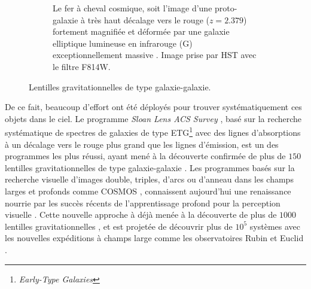 \begin{figure}[tb!]
\begin{subfigure}[t]{0.45\textwidth}
                \caption{Le fer à cheval cosmique, soit l'image d'une proto-galaxie à très haut décalage vers le rouge 
                        ($z=2.379$) fortement magnifiée et déformée par une galaxie elliptique lumineuse en infrarouge (G) exceptionnellement massive 
                        \citep[${5.2\times 10^{12}\, h_{72}^{-1}\, M_\odot}$,][]{Schuldt2019}. 
                 Image prise par HST avec le filtre F814W.}
                \label{fig:sdssj1148}
        \end{subfigure}
        \caption{Lentilles gravitationnelles de type galaxie-galaxie.}
        \label{fig:important lenses}
\end{figure}
 

De ce fait, beaucoup d'effort ont été déployés pour trouver systématiquement ces objets dans le ciel. Le programme 
\textit{Sloan Lens ACS Survey} \citep[SLAC,][]{Bolton2005,Bolton2006}, basé sur la recherche systématique de spectres de galaxies de type ETG\footnote{\textit{Early-Type Galaxies}} 
avec des lignes d'absorptions à un décalage vers le rouge plus grand que les lignes d'émission, 
est un des programmes les plus réussi, ayant mené à la découverte 
confirmée de plus de $150$ lentilles gravitationnelles de type galaxie-galaxie \citep{Bolton2008,Shu2017}. Les programmes 
basés sur la recherche visuelle d'images double, triples, d'arcs ou d'anneau \citep[e.g.][]{Faure2008} dans les champs larges et profonds comme 
COSMOS \citep{Koekemoer2007,Scoville2007}, connaissent aujourd'hui une renaissance nourrie par les succès récents de l'apprentissage profond 
pour la perception visuelle \citep{Krizhevsky2012}. Cette nouvelle approche à déjà menée à la découverte de plus de $1000$ lentilles 
gravitationnelles \citep{Petrillo2017,Huang2021}, et est projetée de découvrir plus de $10^{5}$ systèmes avec les nouvelles expéditions 
à champs large comme les observatoires Rubin \citep{lsst2009} et Euclid \citep{Euclid2010}.

% 



